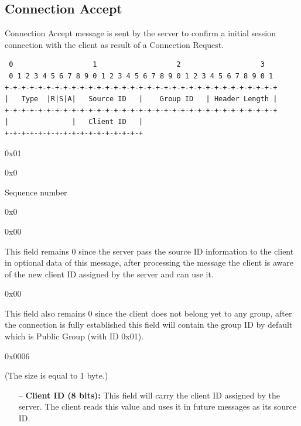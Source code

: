 \documentclass{article}
\begin{document}
\subsection{Connection Accept}
Connection Accept message is sent by the server to confirm a initial session connection with the client as result of a Connection Request.
\clearpage
\begin{verbatim}  
 0                   1                   2                   3  
 0 1 2 3 4 5 6 7 8 9 0 1 2 3 4 5 6 7 8 9 0 1 2 3 4 5 6 7 8 9 0 1
+-+-+-+-+-+-+-+-+-+-+-+-+-+-+-+-+-+-+-+-+-+-+-+-+-+-+-+-+-+-+-+-+
|   Type  |R|S|A|   Source ID   |    Group ID   | Header Length |
+-+-+-+-+-+-+-+-+-+-+-+-+-+-+-+-+-+-+-+-+-+-+-+-+-+-+-+-+-+-+-+-+
|               |   Client ID   |
+-+-+-+-+-+-+-+-+-+-+-+-+-+-+-+-+
\end{verbatim}
\begin{description}[align=left]
    \item [Type:] 0x01
    
    \item [Reserved:] 0x0
    
    \item [Sequence:] Sequence number
    
    \item [Acknowledgement:] 0x0
    
    \item [Source ID:] 0x00
    \begin{flushleft}
        This field remains 0 since the server pass the source ID information to the client in optional data of this message, after processing the message the client is aware of the new client ID assigned by the server and can use it.
    \end{flushleft}
    
    \item [Group ID:] 0x00
    \begin{flushleft}
        This field also remains 0 since the client does not belong yet to any group, after the connection is fully established this field will contain the group ID by default which is Public Group (with ID 0x01).
    \end{flushleft}
    
    \item [Header Length:] 0x0006
    
    \item[Options:] (The size is equal to 1 byte.)
    \begin{itemize}
        \item[--]\textbf{Client ID (8 bits):}
        This field will carry the client ID assigned by the server. The client reads this value and uses it in future messages as its source ID.
    \end{itemize}
\end{description}
\end{document}
